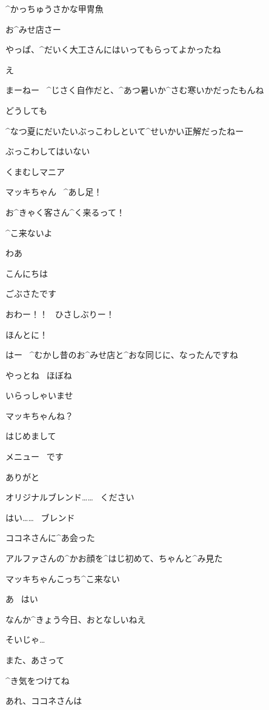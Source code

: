 \page[84]
\Sign ^{かっちゅうさかな}{甲冑魚}

\page
\Makki お^{みせ}{店}さー

\Makki やっぱ、^{だいく}{大工}さんにはいってもらってよかったね

\Alpha え

\Alpha まーねー
\ ^{じさく}{自作}だと、^{あつ}{暑}いか^{さむ}{寒}いかだったもんね

\Alpha どうしても

\Makki ^{なつ}{夏}にだいたいぶっこわしといて^{せいかい}{正解}だったねー

\Alpha ぶっこわしてはいない

\page
\Sign くまむしマニア

\Alpha マッキちゃん
\ ^{あし}{足}！

\Alpha お^{きゃく}{客}さん^{く}{来}るって！

\Makki ^{こ}{来}ないよ

\page[88]
\Alpha わあ

\Kokone こんにちは

\Kokone ごぶさたです

\Alpha おわー！！
\ ひさしぶりー！

\Kokone ほんとに！

\page
\Kokone はー
\ ^{むかし}{昔}のお^{みせ}{店}と^{おな}{同}じに、なったんですね

\Alpha やっとね
\ ほぼね

\page
\Makki いらっしゃいませ

\Kokone マッキちゃんね？

\Kokone はじめまして

\page
\Makki メニュー
\ です

\Kokone ありがと

\page
\Kokone オリジナルブレンド……
\ ください

\Makki はい……
\ ブレンド

\page[95]
\Makki ココネさんに^{あ}{会}った

\Makki アルファさんの^{かお}{顔}を^{はじ}{初}めて、ちゃんと^{み}{見}た

\Kokone マッキちゃんこっち^{こ}{来}ない

\Makki あ
\ はい

\Alpha なんか^{きょう}{今日}、おとなしいねえ

\page
\Makki そいじゃ…

\Alpha また、あさって

\Kokone ^{き}{気}をつけてね

\Makki あれ、ココネさんは

